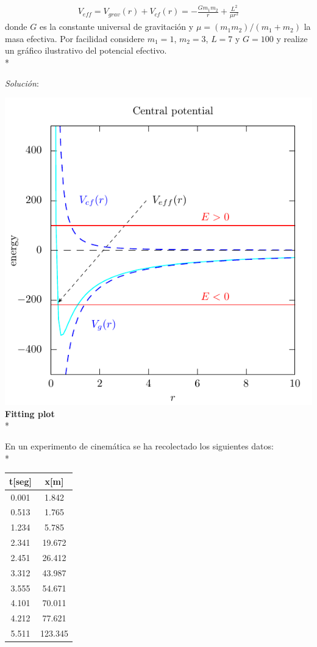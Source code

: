 \documentclass[11.5pt,a4paper]{article}
\begin{document}
\begin{eqnarray*}
V_{eff} = V_{grav}(r)+V_{cf}(r)=-\frac{G m_1 m_2}{r}+\frac{L^2}{\mu r^2}
\end{eqnarray*}
donde $G$ es la constante universal de gravitación y $\mu = (m_1 m_2)/(m_1+m_2)$ la masa efectiva. Por facilidad considere $m_1=1$, $m_2=3$, $L=7$ y $G=100$ y realize un gráfico ilustrativo del potencial efectivo.\\*

\textit{Solución}:

\includegraphics[scale=0.75]{ejercicio2.pdf}\\

\textbf{Fitting plot}\\*

En un experimento de cinemática se ha recolectado los siguientes datos:\\*

\begin{center}
\begin{tabular}{|c|c|}
\hline 
{\bf t[seg]} & {\bf x[m]} \\ 
\hline
0.001 & 1.842 \\ 
\hline 
0.513 & 1.765 \\ 
\hline 
1.234 & 5.785 \\ 
\hline 
2.341 & 19.672 \\ 
\hline 
2.451 & 26.412 \\ 
\hline 
3.312 & 43.987\\
\hline
3.555 & 54.671\\
\hline
4.101 & 70.011\\
\hline
4.212 & 77.621\\
\hline
5.511 & 123.345\\
\hline
\end{tabular} 
\end{center}
\end{document}
